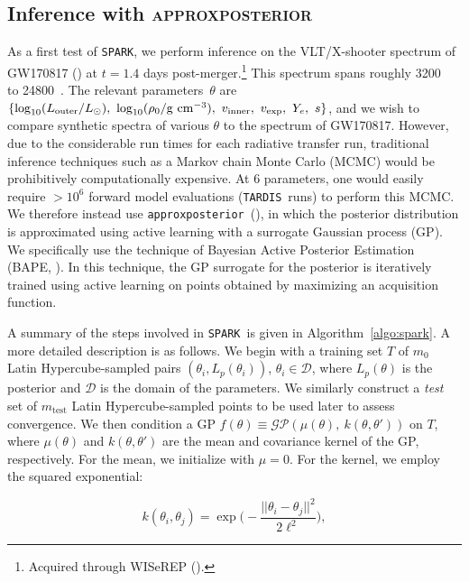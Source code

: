 \documentclass[twocolumn, twocolappendix]{aastex63}
\def\SPARK{\texttt{SPARK}}
\def\TARDIS{\texttt{TARDIS}}
\def\approxposterior{\texttt{approxposterior}}
\begin{document}
\subsection{Inference with \textsc{approxposterior}}\label{ssc:inference}

As a first test of \SPARK, we perform inference on the VLT/X-shooter spectrum of GW170817 (\citealt{pian17, smartt17}) at $t=1.4$ days post-merger.\footnote{Acquired through WISeREP (\citealt{yaron12}).} This spectrum spans roughly 3200~\text{\AA} to 24800~\text{\AA}. The relevant parameters~$\theta$ are $\{\log_{10}(L_{\mathrm{outer}}/L_{\odot}),~\log_{10}(\rho_0/\mathrm{g~cm^{-3}}),~v_{\mathrm{inner}},~v_{\mathrm{exp}},\\~Y_e,~s\}$, and we wish to compare synthetic spectra of various $\theta$ to the spectrum of GW170817. However, due to the considerable run times for each radiative transfer run, traditional inference techniques such as a Markov chain Monte Carlo (MCMC) would be prohibitively computationally expensive. At 6 parameters, one would easily require $>10^6$ forward model evaluations (\TARDIS~runs) to perform this MCMC. We therefore instead use \approxposterior~(\citealt{fleming18, fleming20}), in which the posterior distribution is approximated using active learning with a surrogate Gaussian process (GP). We specifically use the technique of Bayesian Active Posterior Estimation (BAPE, \citealt{kandasamy17}). In this technique, the GP surrogate for the posterior is iteratively trained using active learning on points obtained by maximizing an acquisition function.


A summary of the steps involved in \SPARK~is given in Algorithm~\ref{algo:spark}. A more detailed description is as follows. We begin with a training set $T$ of $m_0$ Latin Hypercube-sampled pairs $(\theta_i, L_p (\theta_i))$, $\theta_i \in \mathcal{D}$, where $L_p (\theta)$ is the posterior and $\mathcal{D}$ is the domain of the parameters. We similarly construct a \textit{test} set of $m_{\mathrm{test}}$ Latin Hypercube-sampled points to be used later to assess convergence. We then condition a GP $f(\theta) \equiv \mathcal{GP} (\mu(\theta),~k(\theta, \theta'))$ on $T$, where $\mu(\theta)$ and $k(\theta, \theta')$ are the mean and covariance kernel of the GP, respectively. For the mean, we initialize with $\mu=0$. For the kernel, we employ the squared exponential:

\begin{equation}\label{eqn:covariance_kernel}
    k(\theta_i, \theta_j) = \exp\Big(-\frac{||\theta_i - \theta_j||^2}{2 \ell^2}\Big),   
\end{equation}
\end{document}
